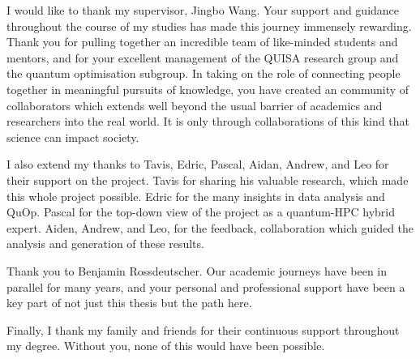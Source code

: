 I would like to thank my supervisor, Jingbo Wang. Your support and guidance throughout the course of my studies has made this journey immensely rewarding. Thank you for pulling together an incredible team of like-minded students and mentors, and for your excellent management of the QUISA research group and the quantum optimisation subgroup. In taking on the role of connecting people together in meaningful pursuits of knowledge, you have created an community of collaborators which extends well beyond the usual barrier of academics and researchers into the real world. It is only through collaborations of this kind that science can impact society.

I also extend my thanks to Tavis, Edric, Pascal, Aidan, Andrew, and Leo for their support on the project. Tavis for sharing his valuable research, which made this whole project possible. Edric for the many insights in data analysis and QuOp. Pascal for the top-down view of the project as a quantum-HPC hybrid expert. Aiden, Andrew, and Leo, for the feedback, collaboration which guided the analysis and generation of these results.

Thank you to Benjamin Rossdeutscher. Our academic journeys have been in parallel for many years, and your personal and professional support have been a key part of not just this thesis but the path here.

Finally, I thank my family and friends for their continuous support throughout my degree. Without you, none of this would have been possible.